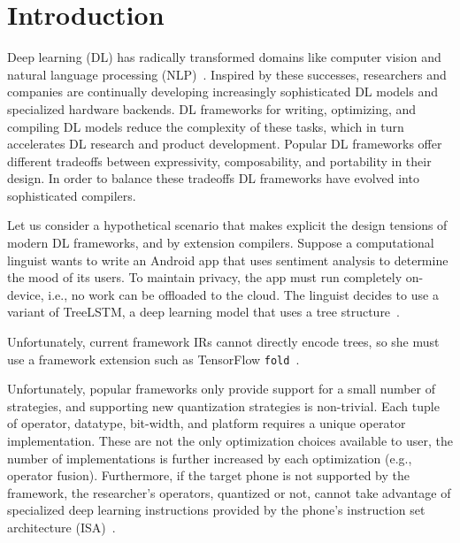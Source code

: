 \section{Introduction}
\label{sec:intro}

Deep learning (DL) has radically transformed domains like
  computer vision and
  natural language processing (NLP)~\citep{yolo, recent_trends_in_nlp}.
Inspired by these successes,
  researchers and companies are continually
  developing increasingly sophisticated DL models and
  specialized hardware backends.
DL frameworks for writing, optimizing, and compiling DL models
  reduce the complexity of these tasks,
  which in turn accelerates DL research and product development.
Popular DL frameworks offer different tradeoffs between
  expressivity, composability, and portability in their design.
In order to balance these tradeoffs DL frameworks have
  evolved into sophisticated compilers.

Let us consider a hypothetical scenario that makes explicit
  the design tensions of modern DL frameworks, and by
  extension compilers.
Suppose a computational linguist wants to write
  an Android app that uses sentiment analysis to
  determine the mood of its users.
To maintain privacy, the app must run completely on-device,
  i.e., no work can be offloaded to the cloud.
The linguist decides to use a variant of TreeLSTM,
  a deep learning model that uses a tree structure~\citep{tree_lstm}.

Unfortunately, current framework IRs cannot directly encode trees,
  so she must use a framework extension
  such as TensorFlow \verb|fold|~\citep{tensorflowfold}.

Unfortunately, popular frameworks only provide support for a small number
  of strategies, and supporting new quantization strategies is non-trivial.
Each tuple of operator, datatype, bit-width, and
  platform requires a unique operator implementation.
These are not the only optimization choices available
  to user, the number of implementations is further
  increased by each optimization (e.g., operator fusion).
Furthermore, if the target phone
  is not supported by the framework,
  the researcher's operators,
  quantized or not,
  cannot take advantage of specialized deep learning instructions
  provided by the phone's instruction set architecture (ISA)~\citep{apple_neural_engine}.

